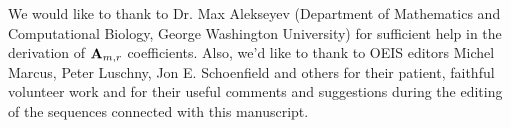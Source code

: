 We would like to thank to Dr. Max Alekseyev (Department of Mathematics and Computational Biology,
George Washington University) for sufficient help in the derivation of ${\mathbf{A}} \sb{m,r}$ coefficients.
Also, we'd like to thank to OEIS editors Michel Marcus, Peter Luschny, Jon E. Schoenfield and others
for their patient, faithful volunteer work and for their useful comments and suggestions during the
editing of the sequences connected with this manuscript.